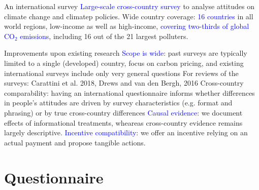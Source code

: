 \begin{frame}{An international survey}
\bbs
\ip \textcolor{blue}{Large-scale cross-country survey} to analyse attitudes on climate change and climatep policies.
\ip Wide country coverage:
\bbvs
\ip \textcolor{blue}{16 countries} in all world regions, low-income as well as high-income, 
\ip \textcolor{blue}{covering two-thirds of global CO$_\text{2}$ emissions}, including 16 out of the 21 largest polluters.
\ee
\ee
{}
\end{frame}


\begin{frame}{Improvements upon existing research}
\bbs
\ip \textcolor{blue}{Scope is wide}: past surveys are typically limited to a single (developed) country, focus on carbon pricing,
and existing international surveys include only very general questions
\bbs
\ip For reviews of the surveys: Carattini et al. 2018, Drews and van den Bergh, 2016
\ee 
\ip Cross-country comparability: having an international questionnaire informs whether differences in people’s attitudes are driven by survey characteristics (e.g. format and phrasing) or by true cross-country differences
\ip \textcolor{blue}{Causal evidence}: we document effects of informational treatments, wheareas cross-country evidence remains largely descriptive.
\ip \textcolor{blue}{Incentive compatibility}: we offer an incentive relying on an actual payment and propose tangible actions.
\ee
\end{frame}


\section{Questionnaire}

